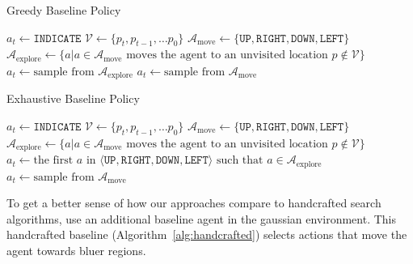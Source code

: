 \begin{algorithm}
    \caption{Greedy Baseline Policy}
    \label{alg:greedy}
    \begin{algorithmic}
            \State \(a_t \leftarrow \mathtt{INDICATE}\)
        \Else
            \State \(\mathcal{V} \leftarrow \{p_t, p_{t-1}, \dots p_0\}\)
            \State \(\mathcal{A}_{\text{move}} \leftarrow \{\mathtt{UP}, \mathtt{RIGHT}, \mathtt{DOWN}, \mathtt{LEFT}\}\)
            \State \(\mathcal{A}_{\text{explore}} \leftarrow \{a | a \in \mathcal{A}_{\text{move}} \text{ moves the agent to an unvisited location } p \notin \mathcal{V}\}\) 
                \State \(a_t \leftarrow \text{sample from } \mathcal{A}_{\text{explore}}\)
            \Else
                \State \(a_t \leftarrow \text{sample from } \mathcal{A}_{\text{move}}\)
            \EndIf
        \EndIf
    \end{algorithmic}
\end{algorithm}

\begin{algorithm}
    \caption{Exhaustive Baseline Policy}
    \label{alg:exhaustive}
    \begin{algorithmic}
            \State \(a_t \leftarrow \mathtt{INDICATE}\)
        \Else
            \State \(\mathcal{V} \leftarrow \{p_t, p_{t-1}, \dots p_0\}\)
            \State \(\mathcal{A}_{\text{move}} \leftarrow \{\mathtt{UP}, \mathtt{RIGHT}, \mathtt{DOWN}, \mathtt{LEFT}\}\)
            \State \(\mathcal{A}_{\text{explore}} \leftarrow \{a | a \in \mathcal{A}_{\text{move}} \text{ moves the agent to an unvisited location } p \notin \mathcal{V}\}\) 
                \State \(a_t \leftarrow \text{the first } a \text{ in } \langle \mathtt{UP}, \mathtt{RIGHT}, \mathtt{DOWN}, \mathtt{LEFT} \rangle \text{ such that } a \in \mathcal{A}_{\text{explore}}\)
            \Else
                \State \(a_t \leftarrow \text{sample from } \mathcal{A}_{\text{move}}\)
            \EndIf
        \EndIf
    \end{algorithmic}
\end{algorithm}

To get a better sense of how our approaches compare to handcrafted search algorithms, use an additional baseline agent in the gaussian environment.
This handcrafted baseline (Algorithm~\ref{alg:handcrafted}) selects actions that move the agent towards bluer regions.

